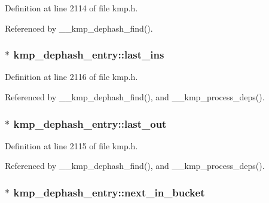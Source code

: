 Definition at line 2114 of file kmp.\-h.



Referenced by \-\_\-\-\_\-kmp\-\_\-dephash\-\_\-find().

\hypertarget{structkmp__dephash__entry_ad54a7a6e0b862b27750bed4730e2d9b0}{
\subsubsection[{last\-\_\-ins}]{$\ast$ kmp\-\_\-dephash\-\_\-entry\-::last\-\_\-ins}}\label{structkmp__dephash__entry_ad54a7a6e0b862b27750bed4730e2d9b0}


Definition at line 2116 of file kmp.\-h.



Referenced by \-\_\-\-\_\-kmp\-\_\-dephash\-\_\-find(), and \-\_\-\-\_\-kmp\-\_\-process\-\_\-deps().

\hypertarget{structkmp__dephash__entry_a0ae786669b6c8b01605717a93f8c2c33}{
\subsubsection[{last\-\_\-out}]{$\ast$ kmp\-\_\-dephash\-\_\-entry\-::last\-\_\-out}}\label{structkmp__dephash__entry_a0ae786669b6c8b01605717a93f8c2c33}


Definition at line 2115 of file kmp.\-h.



Referenced by \-\_\-\-\_\-kmp\-\_\-dephash\-\_\-find(), and \-\_\-\-\_\-kmp\-\_\-process\-\_\-deps().

\hypertarget{structkmp__dephash__entry_a2708bddc7160e13ec29ba5f36cd37e1a}{
\subsubsection[{next\-\_\-in\-\_\-bucket}]{$\ast$ kmp\-\_\-dephash\-\_\-entry\-::next\-\_\-in\-\_\-bucket}}\label{structkmp__dephash__entry_a2708bddc7160e13ec29ba5f36cd37e1a}


